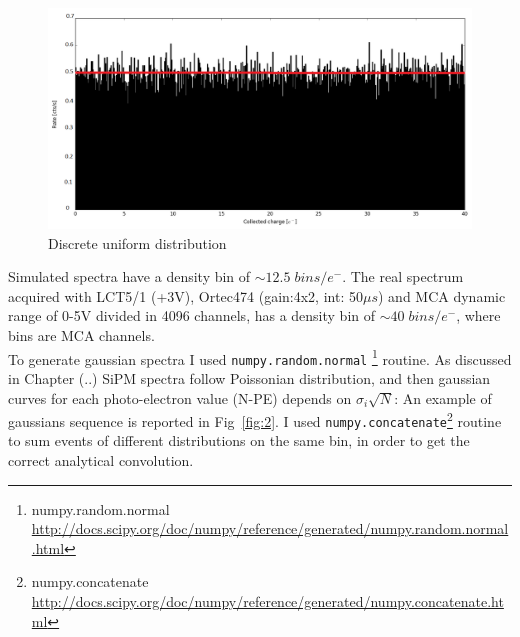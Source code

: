 \documentclass[10pt,a4paper, openany]{book}
\begin{document}
\begin{figure}[!h]
\begin{center}
\includegraphics[scale=0.32]{imm/sim_const_un.png}
\end{center}
\caption{Discrete uniform distribution}
\label{fig:1}
\end{figure}
Simulated spectra have a density bin of $\sim 12.5\; bins/e^-$. The real spectrum acquired with LCT5/1 (+3V), Ortec474 (gain:4x2, int: 50$\mu s$) and MCA dynamic range of 0-5V divided in 4096 channels, has a density bin of $\sim 40\; bins/e^-$, where bins are MCA channels.\\
To generate gaussian spectra I used \verb|numpy.random.normal| \footnote{numpy.random.normal \url{http://docs.scipy.org/doc/numpy/reference/generated/numpy.random.normal.html}} routine. As discussed in Chapter (..)   SiPM spectra follow Poissonian distribution, and then gaussian curves for each photo-electron value (N-PE) depends on $\sigma_i\sqrt{N}$:
An example of gaussians sequence is reported in Fig~\ref{fig:2}. I used \verb|numpy.concatenate|\footnote{numpy.concatenate \url{http://docs.scipy.org/doc/numpy/reference/generated/numpy.concatenate.html}} routine to sum events of different distributions on the same bin, in order to get the correct analytical convolution. 
\end{document}
